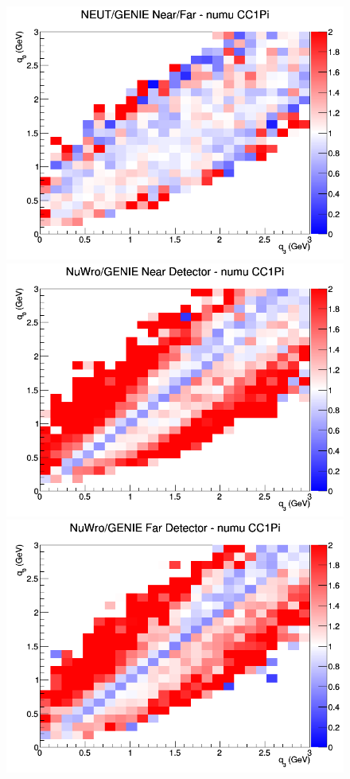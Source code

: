 \begin{figure}[h]
\endminipage
{}
\includegraphics[width=\linewidth]{eff_q0_q3/FGT/ratios/CC1Pi_NEUT_GENIE_numu_NF_q3_q0.png}
\endminipage
\newline
{}
\includegraphics[width=\linewidth]{eff_q0_q3/FGT/ratios/CC1Pi_NuWro_GENIE_numu_near_q3_q0.png}
\endminipage
{}
\includegraphics[width=\linewidth]{eff_q0_q3/FGT/ratios/CC1Pi_NuWro_GENIE_numu_far_q3_q0.png}

\end{figure}
